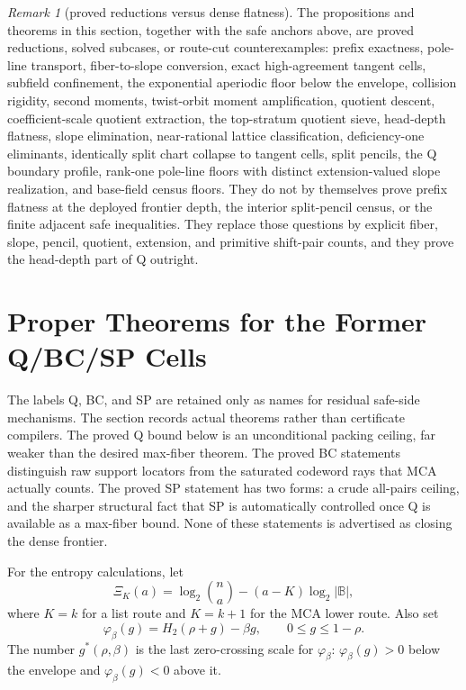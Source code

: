 \documentclass[a4paper,11pt]{amsart}
\theoremstyle{remark}
\newtheorem{remark}[theorem]{Remark}
\newcommand{\B}{\mathbb B}
\newcommand{\Htwo}{H_2}
\begin{document}
\begin{remark}[proved reductions versus dense flatness]\label{rem:proved-not-flat}
The propositions and theorems in this section, together with the safe anchors above, are proved reductions, solved subcases, or route-cut counterexamples: prefix exactness, pole-line transport, fiber-to-slope conversion, exact high-agreement tangent cells, subfield confinement, the exponential aperiodic floor below the envelope, collision rigidity, second moments, twist-orbit moment amplification, quotient descent, coefficient-scale quotient extraction, the top-stratum quotient sieve, head-depth flatness, slope elimination, near-rational lattice classification, deficiency-one eliminants, identically split chart collapse to tangent cells, split pencils, the Q boundary profile, rank-one pole-line floors with distinct extension-valued slope realization, and base-field census floors.  They do not by themselves prove prefix flatness at the deployed frontier depth, the interior split-pencil census, or the finite adjacent safe inequalities.  They replace those questions by explicit fiber, slope, pencil, quotient, extension, and primitive shift-pair counts, and they prove the head-depth part of Q outright.
\end{remark}



\section{Proper Theorems for the Former Q/BC/SP Cells}

The labels Q, BC, and SP are retained only as names for residual safe-side mechanisms.  The section records actual theorems rather than certificate compilers.  The proved Q bound below is an unconditional packing ceiling, far weaker than the desired max-fiber theorem.  The proved BC statements distinguish raw support locators from the saturated codeword rays that MCA actually counts.  The proved SP statement has two forms: a crude all-pairs ceiling, and the sharper structural fact that SP is automatically controlled once Q is available as a max-fiber bound.  None of these statements is advertised as closing the dense frontier.

For the entropy calculations, let
\[
        \Xi_K(a)=\log_2\binom na-(a-K)\log_2|\B|,
\]
where \(K=k\) for a list route and \(K=k+1\) for the MCA lower route.  Also set
\[
        \varphi_\beta(g)=\Htwo(\rho+g)-\beta g,
        \qquad 0\le g\le1-\rho .
\]
The number \(g^*(\rho,\beta)\) is the last zero-crossing scale for \(\varphi_\beta\): \(\varphi_\beta(g)>0\) below the envelope and \(\varphi_\beta(g)<0\) above it.
\end{document}
